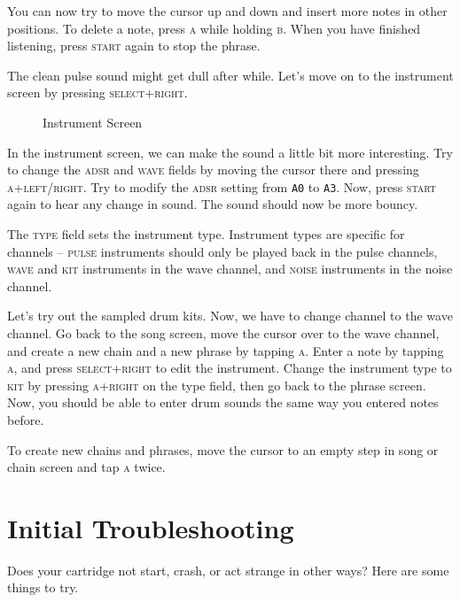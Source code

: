 You can now try to move the cursor up and down and insert more notes in other positions.
To delete a note, press \textsc{a} while holding \textsc{b}. When you have finished listening, press
\textsc{start} again to stop the phrase.

The clean pulse sound might get dull after while. Let's move on to the instrument
screen by pressing \textsc{select+right}.

\begin{figure}[hbtp]
\centering
{}
\caption{Instrument Screen}
\label{fig:instr}
\end{figure}

In the instrument screen, we can make the sound a little bit more interesting. Try to change
the \textsc{adsr} and \textsc{wave} fields by moving the cursor there and pressing \textsc{a+left/right}. Try
to modify the \textsc{adsr} setting from \texttt{A0} to \texttt{A3}. Now, press \textsc{start} again to hear any
change in sound. The sound should now be more bouncy.

The \textsc{type} field sets the instrument type. Instrument types are specific for
channels -- \textsc{pulse} instruments should only be played back in the pulse channels, \textsc{wave} and \textsc{kit}
instruments in the wave channel, and \textsc{noise} instruments in the noise channel.

Let's try out the sampled drum kits. Now, we have to change channel to the wave channel.
Go back to the song screen, move the cursor over to the wave channel, and create a new
chain and a new phrase by tapping \textsc{a}.
Enter a note by tapping \textsc{a}, and press \textsc{select+right} to edit the instrument.
Change the instrument type to \textsc{kit} by pressing \textsc{a+right} on the type field,
then go back to the phrase screen. Now, you should be able to enter drum sounds the same way
you entered notes before.

To create new chains and phrases, move the cursor to an empty step in song or chain screen and tap \textsc{a} twice.

\section{Initial Troubleshooting}

Does your cartridge not start, crash, or act strange in other ways? Here are some things to try.

